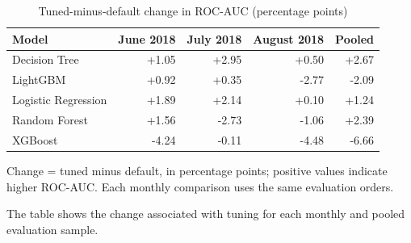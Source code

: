 \begin{table}[htbp]
\centering
\small
\caption{Tuned-minus-default change in ROC-AUC (percentage points)}
\begin{tabular}{lrrrr}
\toprule
Model & June 2018 & July 2018 & August 2018 & Pooled \\
\midrule
Decision Tree & +1.05 & +2.95 & +0.50 & +2.67 \\
LightGBM & +0.92 & +0.35 & -2.77 & -2.09 \\
Logistic Regression & +1.89 & +2.14 & +0.10 & +1.24 \\
Random Forest & +1.56 & -2.73 & -1.06 & +2.39 \\
XGBoost & -4.24 & -0.11 & -4.48 & -6.66 \\
\bottomrule
\end{tabular}
\par\smallskip\begin{minipage}{\linewidth}\footnotesize Change = tuned minus default, in percentage points; positive values indicate higher ROC-AUC. Each monthly comparison uses the same evaluation orders.\end{minipage}
\end{table}
The table shows the change associated with tuning for each monthly and pooled evaluation sample.

